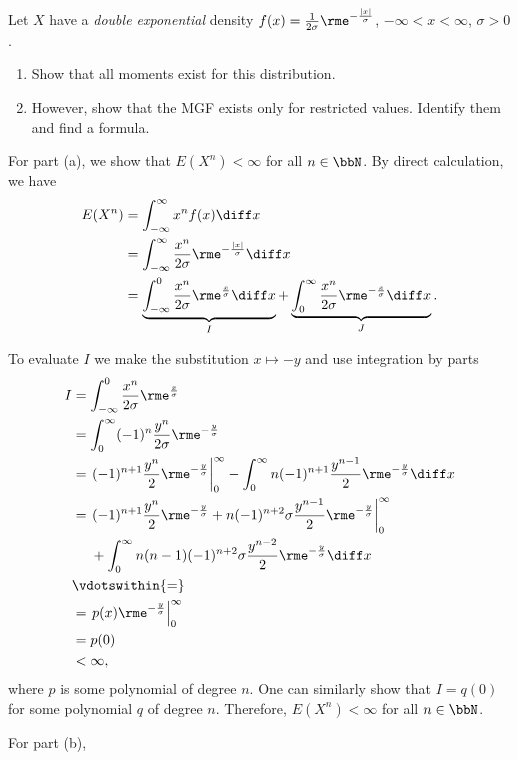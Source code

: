 \begin{problem}[Handout 13, \# 7]
  Let \(X\) have a \emph{double exponential} density
  \(f(x)=\frac{1}{2\sigma}\rme^{-\frac{|x|}{\sigma}}\),
  \(-\infty<x<\infty\), \(\sigma>0\).
  \begin{enumerate}[label=(\alph*),noitemsep]
  \item Show that all moments exist for this distribution.
  \item However, show that the MGF exists only for restricted
    values. Identify them and find a formula.
  \end{enumerate}
\end{problem}
\begin{solution}
  For part (a), we show that \(E(X^n)<\infty\) for all \(n\in\bbN\). By
  direct calculation, we have
  \begin{align*}
    E(X^n)
    &=\int_{-\infty}^\infty x^nf(x)\diff x\\
    &=\int_{-\infty}^\infty
      \frac{x^n}{2\sigma}\rme^{-\frac{|x|}{\sigma}}\diff x\\
    &=
      \underbrace{\int_{-\infty}^0\frac{x^n}{2\sigma}\rme^{\frac{x}{\sigma}}\diff
      x}_{I}
      +\underbrace{\int_0^\infty
      \frac{x^n}{2\sigma}\rme^{-\frac{x}{\sigma}}\diff x}_{J}.
  \end{align*}

  To evaluate \(I\) we make the substitution \(x\mapsto -y\) and use
  integration by parts
  \begin{equation}
    \label{eq:9:I-integration-by-parts}
    \begin{aligned}
      I
      &=\int_{-\infty}^0\frac{x^n}{2\sigma}\rme^{\frac{x}{\sigma}}\\
      &=\int_0^\infty(-1)^n\frac{y^n}{2\sigma}\rme^{-\frac{y}{\sigma}}\\
      &=\left.(-1)^{n+1}\frac{y^n}{2}\rme^{-\frac{y}{\sigma}}\right|_0^\infty
      -\int_0^\infty
      n(-1)^{n+1}\frac{y^{n-1}}{2}\rme^{-\frac{y}{\sigma}}\diff x\\
      &=\left.(-1)^{n+1}\frac{y^n}{2}\rme^{-\frac{y}{\sigma}}
        +n(-1)^{n+2}\sigma\frac{y^{n-1}}{2}\rme^{-\frac{y}{\sigma}}\right|_0^\infty\\
      &\phantom{{}={}}
      +\int_0^\infty
      n(n-1)(-1)^{n+2}\sigma\frac{y^{n-2}}{2}\rme^{-\frac{y}{\sigma}}\diff x\\
      &\vdotswithin{=}\\
      &=\left.p(x)\rme^{-\frac{y}{\sigma}}\right|_0^\infty\\
      &=p(0)\\
      &<\infty,
    \end{aligned}
  \end{equation}
  where \(p\) is some polynomial of degree \(n\). One can similarly show
  that \(I=q(0)\) for some polynomial \(q\) of degree \(n\). Therefore,
  \(E(X^n)<\infty\) for all \(n\in\bbN\).

  For part (b),
\end{solution}
\newpage

